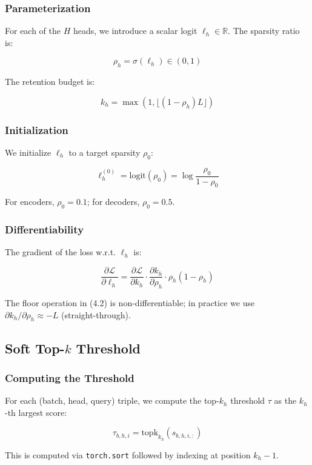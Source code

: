 \subsubsection{Parameterization}

For each of the $H$ heads, we introduce a scalar logit $\ell_h \in \mathbb{R}$. 
The sparsity ratio is:

\[
\rho_h = \sigma(\ell_h) \in (0, 1)
\]

The retention budget is:

\[
k_h = \max(1, \lfloor (1 - \rho_h) L \rfloor)
\]

\subsubsection{Initialization}

We initialize $\ell_h$ to a target sparsity $\rho_0$:

\[
\ell_h^{(0)} = \text{logit}(\rho_0) = \log \frac{\rho_0}{1 - \rho_0}
\]

For encoders, $\rho_0 = 0.1$; for decoders, $\rho_0 = 0.5$.

\subsubsection{Differentiability}

The gradient of the loss w.r.t. $\ell_h$ is:

\[
\frac{\partial \mathcal{L}}{\partial \ell_h} = \frac{\partial \mathcal{L}}{\partial k_h} \cdot \frac{\partial k_h}{\partial \rho_h} \cdot \rho_h (1 - \rho_h)
\]

The floor operation in (4.2) is non-differentiable; in practice we use 
$\partial k_h / \partial \rho_h \approx -L$ (straight-through).

\subsection{Soft Top-$k$ Threshold}

\subsubsection{Computing the Threshold}

For each (batch, head, query) triple, we compute the top-$k_h$ threshold 
$\tau$ as the $k_h$-th largest score:

\[
\tau_{b, h, i} = \text{topk}_{k_h}(s_{b, h, i, :})
\]

This is computed via \texttt{torch.sort} followed by indexing at position $k_h - 1$.

